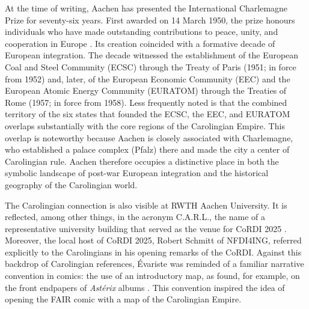 \documentclass{inggrid}
\begin{document}
At the time of writing, Aachen has presented the International Charlemagne Prize for seventy-six years. First awarded on 14 March 1950, the prize honours individuals who have made outstanding contributions to peace, unity, and cooperation in Europe \cite{stiftung_internationaler_karlspreis_zu_aachen_start_nodate}. Its creation coincided with a formative decade of European integration. The decade witnessed the establishment of the European Coal and Steel Community (ECSC) through the Treaty of Paris (1951; in force from 1952) and, later, of the European Economic Community (EEC) and the European Atomic Energy Community (EURATOM) through the Treaties of Rome (1957; in force from 1958). Less frequently noted is that the combined territory of the six states that founded the ECSC, the EEC, and EURATOM overlaps substantially with the core regions of the Carolingian Empire. This overlap is noteworthy because Aachen is closely associated with Charlemagne, who established a palace complex (Pfalz) there and made the city a center of Carolingian rule. Aachen therefore occupies a distinctive place in both the symbolic landscape of post-war European integration and the historical geography of the Carolingian world.

The Carolingian connection is also visible at RWTH Aachen University. It is reflected, among other things, in the acronym C.A.R.L., the name of a representative university building that served as the venue for CoRDI 2025 \cite{nfdi_ev_cordi_nodate}. Moreover, the local host of CoRDI 2025, Robert Schmitt of NFDI4ING, referred explicitly to the Carolingians in his opening remarks of the CoRDI. Against this backdrop of Carolingian references, Évariste was reminded of a familiar narrative convention in comics: the use of an introductory map, as found, for example, on the front endpapers of \textit{Astérix} albums \cite{goscinny_asterix_1961}. This convention inspired the idea of opening the FAIR comic with a map of the Carolingian Empire.
\end{document}
